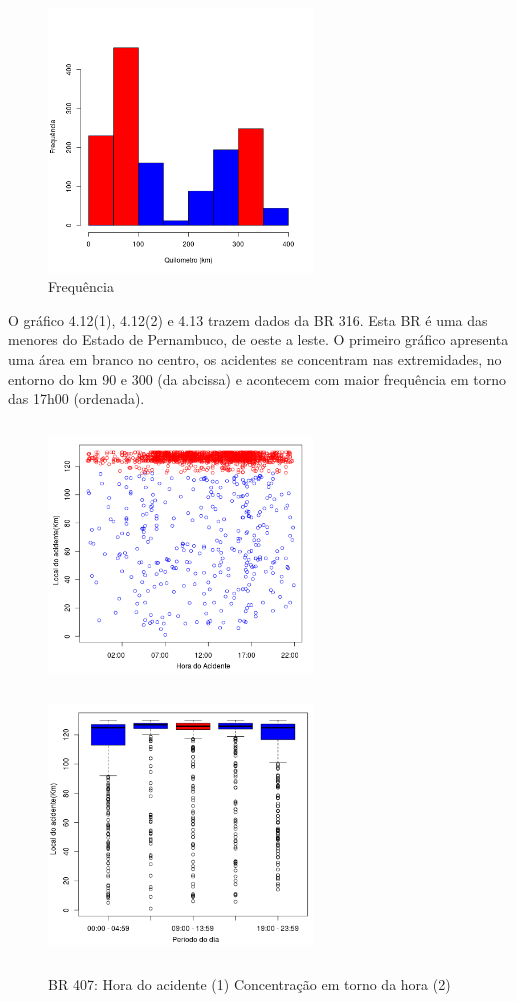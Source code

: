 \quad \quad
\begin{figure}[h]
	\centering
	\caption{ Frequência}
	\includegraphics[width=7cm,height=7cm]{Figuras/Preprocess/br316_3.png}
\end{figure}

O gráfico 4.12(1), 4.12(2)  e 4.13 trazem dados da BR 316. Esta BR é uma das menores do Estado de Pernambuco, de oeste a leste. O primeiro gráfico apresenta uma área em branco no centro, os acidentes se concentram nas extremidades, no entorno do km 90 e 300 (da abcissa) e acontecem com maior frequência em torno das 17h00 (ordenada).

\pagebreak

\begin{figure}[h]
	\caption{BR 407: Hora do acidente (1) Concentração em torno da hora (2)}
	\includegraphics[width=7cm,height=7cm]{Figuras/Preprocess/br407_1.png}
	\includegraphics[width=7cm,height=7cm]{Figuras/Preprocess/br407_3.png}

\end{figure}

